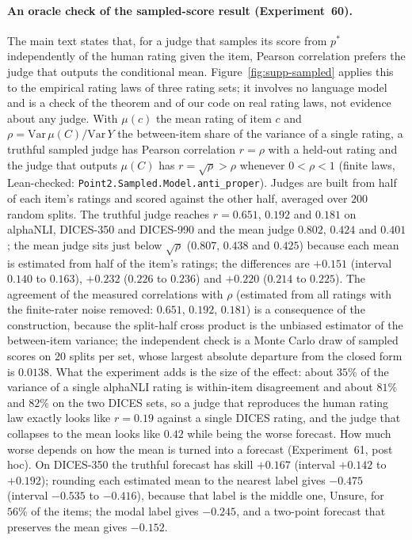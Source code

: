 \paragraph{An oracle check of the sampled-score result (Experiment~60).}
The main text states that, for a judge that samples its score from $p^*$ independently of the human rating given the item, Pearson correlation prefers the judge that outputs the conditional mean.
Figure~\ref{fig:supp-sampled} applies this to the empirical rating laws of three rating sets; it involves no language model and is a check of the theorem and of our code on real rating laws, not evidence about any judge.
With $\mu(c)$ the mean rating of item $c$ and $\rho=\mathrm{Var}\,\mu(C)/\mathrm{Var}\,Y$ the between-item share of the variance of a single rating, a truthful sampled judge has Pearson correlation $r=\rho$ with a held-out rating and the judge that outputs $\mu(C)$ has $r=\sqrt{\rho}>\rho$ whenever $0<\rho<1$ (finite laws, Lean-checked: \texttt{Point2.Sampled.Model.anti\_\allowbreak proper}).
Judges are built from half of each item's ratings and scored against the other half, averaged over $200$ random splits.
The truthful judge reaches $r=0.651$, $0.192$ and $0.181$ on alphaNLI, DICES-350 and DICES-990 and the mean judge $0.802$, $0.424$ and $0.401$; the mean judge sits just below $\sqrt{\rho}$ ($0.807$, $0.438$ and $0.425$) because each mean is estimated from half of the item's ratings; the differences are $+0.151$ (interval $0.140$ to $0.163$), $+0.232$ ($0.226$ to $0.236$) and $+0.220$ ($0.214$ to $0.225$).
The agreement of the measured correlations with $\rho$ (estimated from all ratings with the finite-rater noise removed: $0.651$, $0.192$, $0.181$) is a consequence of the construction, because the split-half cross product is the unbiased estimator of the between-item variance; the independent check is a Monte Carlo draw of sampled scores on $20$ splits per set, whose largest absolute departure from the closed form is $0.0138$.
What the experiment adds is the size of the effect: about $35\%$ of the variance of a single alphaNLI rating is within-item disagreement and about $81\%$ and $82\%$ on the two DICES sets, so a judge that reproduces the human rating law exactly looks like $r=0.19$ against a single DICES rating, and the judge that collapses to the mean looks like $0.42$ while being the worse forecast.
How much worse depends on how the mean is turned into a forecast (Experiment~61, post hoc).
On DICES-350 the truthful forecast has skill $+0.167$ (interval $+0.142$ to $+0.192$); rounding each estimated mean to the nearest label gives $-0.475$ (interval $-0.535$ to $-0.416$), because that label is the middle one, Unsure, for $56\%$ of the items; the modal label gives $-0.245$, and a two-point forecast that preserves the mean gives $-0.152$.
